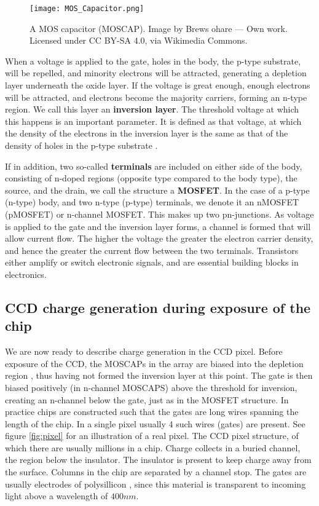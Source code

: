 \documentclass[../main.tex]{subfiles}
\begin{document}
	\begin{figure}[h!]
		\centering
		\texttt{[image: MOS\_Capacitor.png]}
		\caption{A MOS capacitor (MOSCAP). Image by Brews ohare — Own work. Licensed under CC BY-SA 4.0, via Wikimedia Commons.
		}
		\label{fig:mosfet}
	\end{figure}
	When a voltage is applied to the gate, holes in the body, the p-type substrate, will be repelled, and minority electrons will be attracted, generating a depletion layer underneath the oxide layer. If the voltage is great enough, enough electrons will be attracted, and electrons become the majority carriers, forming an n-type region. We call this layer an \textbf{inversion layer}. The threshold voltage at which this happens is an important parameter. It is defined as that voltage, at which the density of the electrons in the inversion layer is the same as that of the density of holes in the p-type substrate \cite{solidstatephysicsbook}. 
	
	If in addition, two so-called \textbf{terminals} are included on either side of the body, consisting of n-doped regions (opposite type compared to the body type), the source, and the drain, we call the structure a \textbf{MOSFET}. In the case of a p-type (n-type) body, and two n-type (p-type) terminals, we denote it an nMOSFET (pMOSFET)  or n-channel MOSFET. This makes up two pn-junctions. As voltage is applied to the gate and the inversion layer forms, a channel is formed that will allow current flow. The higher the voltage the greater the electron carrier density, and hence the greater the current flow between the two terminals. Transistors either amplify or switch electronic signals, and are essential building blocks in electronics. 
	
	\subsection{CCD charge generation during exposure of the chip}
	We are now ready to describe charge generation in the CCD pixel. Before exposure of the CCD, the MOSCAPs in the array are biased into the depletion region \cite{CCDbook}, thus having not formed the inversion layer at this point. The gate is then biased positively (in n-channel MOSCAPS) above the threshold for inversion, creating an n-channel below the gate, just as in the MOSFET structure. In practice chips are constructed such that the gates are long wires spanning the length of the chip\cite{teledyneart}. In a single pixel usually 4 such wires (gates) are present. See figure \ref{fig:pixel} for an illustration of a real pixel. The CCD pixel structure, of which there are usually millions in a chip\cite{CCDdatareductionguide}. Charge collects in a buried channel\cite{teledyneart}, the region below the insulator. The insulator is present to keep charge away from the surface. Columns in the chip are separated by a channel stop\cite{teledyneart}. The gates are usually electrodes of polysillicon \cite{CCDbook}, since this material is transparent to incoming light above a wavelength of $400nm$.
	
\end{document}
